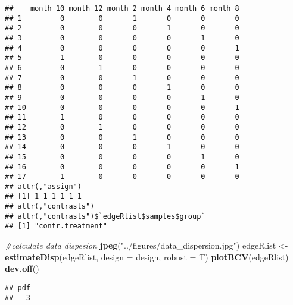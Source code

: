 \documentclass[]{article}
\newenvironment{Shaded}{\begin{snugshade}}{\end{snugshade}}
\newcommand{\CommentTok}[1]{\textcolor[rgb]{0.56,0.35,0.01}{\textit{#1}}}
\newcommand{\DataTypeTok}[1]{\textcolor[rgb]{0.13,0.29,0.53}{#1}}
\newcommand{\KeywordTok}[1]{\textcolor[rgb]{0.13,0.29,0.53}{\textbf{#1}}}
\newcommand{\NormalTok}[1]{#1}
\newcommand{\OperatorTok}[1]{\textcolor[rgb]{0.81,0.36,0.00}{\textbf{#1}}}
\newcommand{\OtherTok}[1]{\textcolor[rgb]{0.56,0.35,0.01}{#1}}
\newcommand{\StringTok}[1]{\textcolor[rgb]{0.31,0.60,0.02}{#1}}
\begin{document}
\begin{verbatim}
##    month_10 month_12 month_2 month_4 month_6 month_8
## 1         0        0       1       0       0       0
## 2         0        0       0       1       0       0
## 3         0        0       0       0       1       0
## 4         0        0       0       0       0       1
## 5         1        0       0       0       0       0
## 6         0        1       0       0       0       0
## 7         0        0       1       0       0       0
## 8         0        0       0       1       0       0
## 9         0        0       0       0       1       0
## 10        0        0       0       0       0       1
## 11        1        0       0       0       0       0
## 12        0        1       0       0       0       0
## 13        0        0       1       0       0       0
## 14        0        0       0       1       0       0
## 15        0        0       0       0       1       0
## 16        0        0       0       0       0       1
## 17        1        0       0       0       0       0
## attr(,"assign")
## [1] 1 1 1 1 1 1
## attr(,"contrasts")
## attr(,"contrasts")$`edgeRlist$samples$group`
## [1] "contr.treatment"
\end{verbatim}

\begin{Shaded}
\begin{Highlighting}[]
\CommentTok{#calculate data dispesion}
\KeywordTok{jpeg}\NormalTok{(}\StringTok{"../figures/data_dispersion.jpg"}\NormalTok{)}
\NormalTok{edgeRlist <-}\StringTok{ }\KeywordTok{estimateDisp}\NormalTok{(edgeRlist, }\DataTypeTok{design =}\NormalTok{ design, }\DataTypeTok{robust =}\NormalTok{ T)}
\KeywordTok{plotBCV}\NormalTok{(edgeRlist)}
\KeywordTok{dev.off}\NormalTok{()}
\end{Highlighting}
\end{Shaded}

\begin{verbatim}
## pdf 
##   3
\end{verbatim}

\begin{Shaded}
\end{Shaded}
\end{document}
